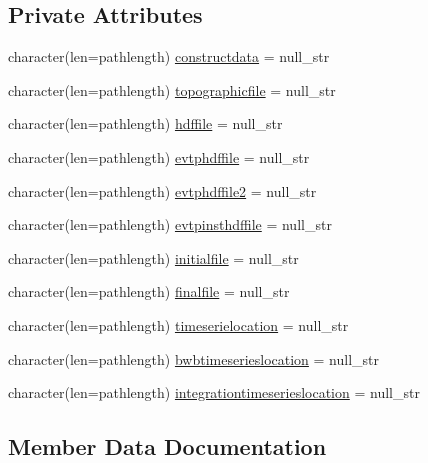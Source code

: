 \subsection*{Private Attributes}
\begin{DoxyCompactItemize}
\item 
character(len=pathlength) \mbox{\hyperlink{structmodulebasin_1_1t__files_af7a37accb475e4a0a42d98a07f96373c}{constructdata}} = null\+\_\+str
\item 
character(len=pathlength) \mbox{\hyperlink{structmodulebasin_1_1t__files_ad71287bd7c4fdfc427731fb881c60841}{topographicfile}} = null\+\_\+str
\item 
character(len=pathlength) \mbox{\hyperlink{structmodulebasin_1_1t__files_a0b374f8fa0de03643c43ab248c2081b7}{hdffile}} = null\+\_\+str
\item 
character(len=pathlength) \mbox{\hyperlink{structmodulebasin_1_1t__files_aaacf684f57a418ba73af83a52ab5b5e5}{evtphdffile}} = null\+\_\+str
\item 
character(len=pathlength) \mbox{\hyperlink{structmodulebasin_1_1t__files_a758575627d20c186afdf04ec3a430cb0}{evtphdffile2}} = null\+\_\+str
\item 
character(len=pathlength) \mbox{\hyperlink{structmodulebasin_1_1t__files_a707944f0a3f93b8916b19b6fe5703dd9}{evtpinsthdffile}} = null\+\_\+str
\item 
character(len=pathlength) \mbox{\hyperlink{structmodulebasin_1_1t__files_a2106147f88565db2a3bb4b4186e5b749}{initialfile}} = null\+\_\+str
\item 
character(len=pathlength) \mbox{\hyperlink{structmodulebasin_1_1t__files_a411f4b125cc7a678e2fb0bc1d59f291c}{finalfile}} = null\+\_\+str
\item 
character(len=pathlength) \mbox{\hyperlink{structmodulebasin_1_1t__files_a56c413fe2bfbe7d1930f7c1d0ffe1ef4}{timeserielocation}} = null\+\_\+str
\item 
character(len=pathlength) \mbox{\hyperlink{structmodulebasin_1_1t__files_ad60a126c188e4964868f78b6d46aa734}{bwbtimeserieslocation}} = null\+\_\+str
\item 
character(len=pathlength) \mbox{\hyperlink{structmodulebasin_1_1t__files_aa76d2d55d47806c4db59101f50d65123}{integrationtimeserieslocation}} = null\+\_\+str
\end{DoxyCompactItemize}


\subsection{Member Data Documentation}
\mbox{\label{structmodulebasin_1_1t__files_ad60a126c188e4964868f78b6d46aa734}} 
